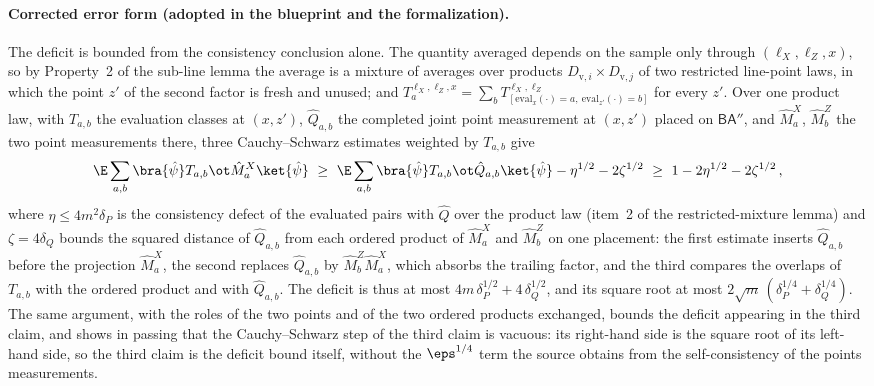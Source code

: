 \documentclass[11pt]{article}
\begin{document}
\paragraph{Corrected error form (adopted in the blueprint and the
formalization).}
The deficit is bounded from the consistency conclusion alone.  The
quantity averaged depends on the sample only through $(\ell_X, \ell_Z,
x)$, so by Property~2 of the sub-line lemma the average is a mixture of
averages over products $D_{\mathrm{v},i} \times D_{\mathrm{v},j}$ of two
restricted line-point laws, in which the point $z'$ of the second factor is
fresh and unused; and $T^{\ell_X,\ell_Z,x}_a = \sum_b
T^{\ell_X,\ell_Z}_{[\mathrm{eval}_x(\cdot)=a,\ \mathrm{eval}_{z'}(\cdot)=b]}$
for every $z'$.  Over one product law, with $T_{a,b}$ the evaluation
classes at $(x, z')$, $\hat Q_{a,b}$ the completed joint point measurement
at $(x,z')$ placed on $\mathsf{B}\mathsf{A}''$, and $\hat M^X_a$, $\hat
M^Z_b$ the two point measurements there, three Cauchy--Schwarz estimates
weighted by $T_{a,b}$ give
\begin{equation*}
  \E \sum_{a,b} \bra{\hat\psi} T_{a,b} \ot \hat M^X_a \ket{\hat\psi}
  \ \ge\ \E \sum_{a,b} \bra{\hat\psi} T_{a,b} \ot \hat Q_{a,b}
  \ket{\hat\psi} - \eta^{1/2} - 2\zeta^{1/2}
  \ \ge\ 1 - 2\eta^{1/2} - 2\zeta^{1/2}\,,
\end{equation*}
where $\eta \le 4m^2\delta_P$ is the consistency defect of the evaluated
pairs with $\hat Q$ over the product law (item~2 of the restricted-mixture
lemma) and $\zeta = 4\delta_Q$ bounds the squared distance of $\hat
Q_{a,b}$ from each ordered product of $\hat M^X_a$ and $\hat M^Z_b$ on one
placement: the first estimate inserts $\hat Q_{a,b}$ before the projection
$\hat M^X_a$, the second replaces $\hat Q_{a,b}$ by
$\hat M^Z_b \hat M^X_a$, which absorbs the trailing factor, and the third
compares the overlaps of $T_{a,b}$ with the ordered product and with $\hat
Q_{a,b}$.  The deficit is thus at most $4m\,\delta_P^{1/2} +
4\,\delta_Q^{1/2}$, and its square root at most
$2\sqrt{m}\,(\delta_P^{1/4} + \delta_Q^{1/4})$.  The same argument, with the
roles of the two points and of the two ordered products exchanged, bounds
the deficit appearing in the third claim, and shows in passing that the
Cauchy--Schwarz step of the third claim is vacuous: its right-hand side is
the square root of its left-hand side, so the third claim is the deficit
bound itself, without the $\eps^{1/4}$ term the source obtains from the
self-consistency of the points measurements.
\end{document}

